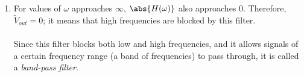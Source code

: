 \begin{enumerate}
{\begin{enumerate}
  \item For values of $\omega$ approaches $\infty$, $\abs{H(\omega)}$ also approaches $0$.
    Therefore, $\widetilde{V}_{out} = 0$; it means that high frequencies are blocked by this filter.
    \\
    \\
    Since this filter blocks both low and high frequencies, and it allows signals of a certain frequency range (a band of frequencies) to pass through, it is called a \emph{band-pass filter}.

\end{enumerate}

}



\end{enumerate}

